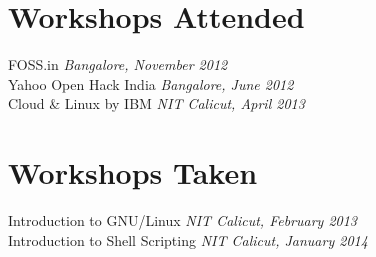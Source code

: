 \documentclass[margin,line]{resume}
\begin{document}
\begin{resume}
      
   

%
%   
%	
%	
%	 
   
\pagebreak

    \section{\mysidestyle Workshops Attended} 
	FOSS.in \hfill \textit{Bangalore, November 2012}  \\%
    Yahoo Open Hack India \hfill \textit{Bangalore, June 2012}    \\
    Cloud \& Linux by IBM \hfill \textit{NIT Calicut, April 2013}    \\

            


    \section{\mysidestyle Workshops Taken} 
	Introduction to GNU/Linux \hfill \textit{NIT Calicut, February 2013}    \\
	Introduction to Shell Scripting \hfill \textit{NIT Calicut, January 2014}    \\    			    			


\end{resume}
\end{document}

